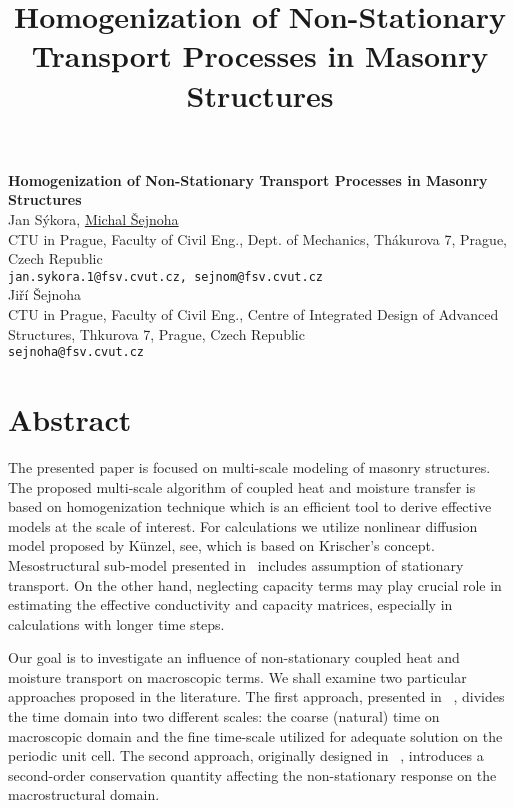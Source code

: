 \title{Homogenization of Non-Stationary Transport Processes in Masonry Structures}
\author{} \institute{}

\begin{center}

\textbf{\Large Homogenization of Non-Stationary Transport Processes in Masonry Structures}\\
\vspace{10mm}
{\large Jan S\'{y}kora, \underline{Michal \v{S}ejnoha}}\\
CTU in Prague, Faculty of Civil Eng., Dept. of Mechanics, Th\'akurova 7, Prague, Czech Republic\\
{\tt jan.sykora.1@fsv.cvut.cz, sejnom@fsv.cvut.cz}\\
\vspace{4mm} %
{\large Ji\v{r}\'{i} \v{S}ejnoha}\\
CTU in Prague, Faculty of Civil Eng., Centre of Integrated Design of Advanced Structures, Thkurova 7, Prague, Czech Republic\\
{\tt sejnoha@fsv.cvut.cz}
\end{center}

\section*{Abstract}

The presented paper is focused on multi-scale modeling of masonry structures. The proposed multi-scale algorithm of coupled heat and moisture transfer is based on homogenization technique which is an efficient tool to derive effective models at the scale of interest. For calculations we utilize nonlinear diffusion model proposed by K\"{u}nzel, see\cite{Kunzel97}, which is based on Krischer's concept. Mesostructural sub-model presented in~\cite{Sykora10} includes assumption of stationary transport. On the other hand, neglecting capacity terms may play crucial role in estimating the effective conductivity and capacity matrices, especially in calculations with longer time steps.

Our goal is to investigate an influence of non-stationary coupled heat and moisture transport on macroscopic terms. We shall examine two particular approaches proposed in the literature. The first approach, presented in ~\cite{Fish02,Manchiraju07}, divides the time domain into two different scales: the coarse (natural) time on macroscopic domain and the fine time-scale utilized for adequate solution on the periodic unit cell. The second approach, originally designed in ~\cite{Larsson10}, introduces a second-order conservation quantity affecting the non-stationary response on the macrostructural domain.

